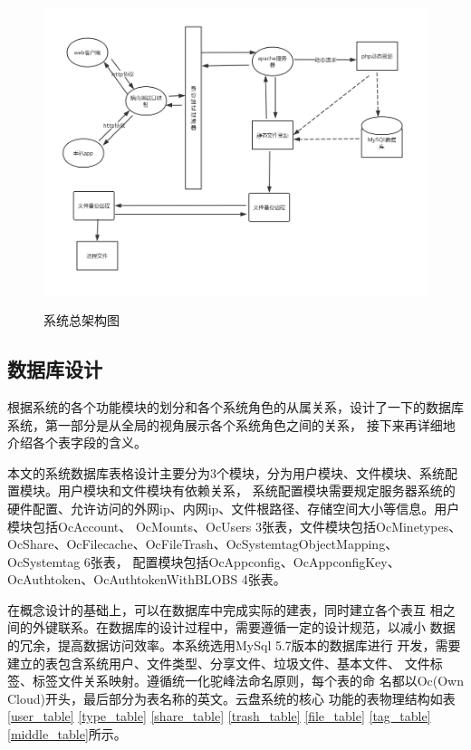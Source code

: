 \begin{figure}[H]
    \centering
    \includegraphics[width=130mm]{./figures/server.png}
    \label{server_img}
    \caption{系统总架构图}
  \end{figure}

\subsection{数据库设计}
根据系统的各个功能模块的划分和各个系统角色的从属关系，设计了一下的数据库系统，第一部分是从全局的视角展示各个系统角色之间的关系，
接下来再详细地介绍各个表字段的含义。

本文的系统数据库表格设计主要分为3个模块，分为用户模块、文件模块、系统配置模块。用户模块和文件模块有依赖关系，
系统配置模块需要规定服务器系统的硬件配置、允许访问的外网ip、内网ip、文件根路径、存储空间大小等信息。用户模块包括OcAccount、
OcMounts、OcUsers 3张表，文件模块包括OcMinetypes、OcShare、OcFilecache、OcFileTrash、OcSystemtagObjectMapping、OcSystemtag 6张表，
配置模块包括OcAppconfig、OcAppconfigKey、OcAuthtoken、OcAuthtokenWithBLOBS 4张表。

在概念设计的基础上，可以在数据库中完成实际的建表，同时建立各个表互
相之间的外键联系。在数据库的设计过程中，需要遵循一定的设计规范，以减小
数据的冗余，提高数据访问效率。本系统选用MySql 5.7版本的数据库进行
开发，需要建立的表包含系统用户、文件类型、分享文件、垃圾文件、基本文件、
文件标签、标签文件关系映射。遵循统一化驼峰法命名原则，每个表的命
名都以Oc(Own Cloud)开头，最后部分为表名称的英文。云盘系统的核心
功能的表物理结构如表\ref{user_table} \ref{type_table} \ref{share_table} 
\ref{trash_table} \ref{file_table} \ref{tag_table} \ref{middle_table}所示。


